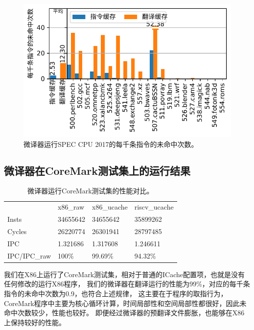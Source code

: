 \begin{figure}[h]
  \centering
  \includegraphics[width=1\linewidth]{./plot/new_cache_miss.pdf}
  \caption{微译器运行SPEC CPU 2017的每千条指令的未命中次数。}
  \label{img:new_cache_miss}
\end{figure}

\subsection{微译器在CoreMark测试集上的运行结果}

\begin{table}[]
  \centering
  \caption{
    微译器运行CoreMark测试集的性能对比。
  }
  \label{tab:coremark}
  \begin{tabular}{llll}
  \rowcolor[HTML]{FFCE93} 
               & x86\_raw & x86\_ucache & riscv\_ucache \\
  Insts        & 34655642 & 34655642    & 35899262      \\
  Cycles       & 26220774 & 26301941    & 28797485      \\
  IPC          & 1.321686 & 1.317608    & 1.246611      \\
  IPC/IPC\_raw & 100\%    & 99.69\%     & 94.32\%      
  \end{tabular}
  \end{table}

我们在X86上运行了CoreMark测试集，相对于普通的ICache配置项，也就是没有任何修改的运行X86程序，
我们的微译器在翻译运行的性能为99\%，对应的每千条指令的未命中次数为0.9，也符合上述规律，
这主要在于程序的取指行为，CoreMark程序中主要为核心循环计算，时间局部性和空间局部性都很好，因此未命中次数较少，性能也较好。
即便经过微译器的预翻译文件膨胀，也能够在X86上保持较好的性能。


